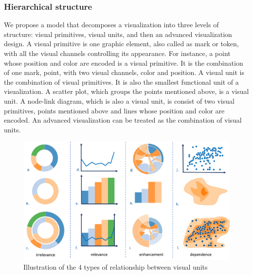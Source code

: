 \documentclass[review,journal]{vgtc}         %
\begin{document}
\subsubsection{Hierarchical structure}
We propose a model that decomposes a visualization into three levels of structure: visual primitives, visual units, and then an advanced visualization design. A visual primitive is one graphic element, also called as mark\cite{munzner_visualization_2014} or token\cite{huron_constructive_2014}, with all the visual channels controlling its appearance. For instance, a point whose position and color are encoded is a visual primitive. It is the combination of one mark, point, with two visual channels, color and position. A visual unit is the combination of visual primitives. It is also the smallest functional unit of a visualization. A scatter plot, which groups the points mentioned above, is a visual unit. A node-link diagram, which is also a visual unit, is consist of two visual primitives, points mentioned above and lines whose position and color are encoded.  An advanced visualization can be treated as the combination of visual units. 

\par
\begin{figure}[tb]
 \centering %
 \includegraphics[width=\columnwidth]{unit_relationship}
 \caption{Illustration of the 4 types of relationship between visual units}
 \label{fig:sample}
\end{figure}
\end{document}
